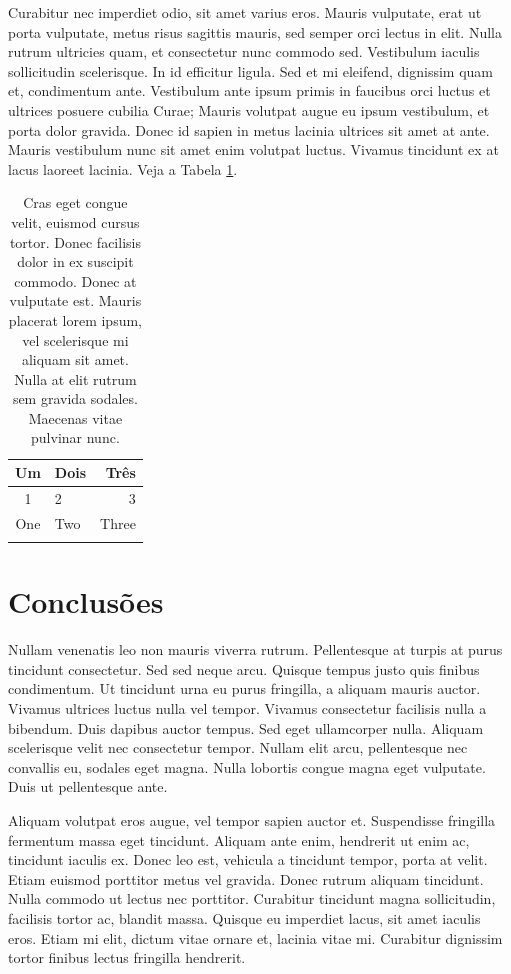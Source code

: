 \begin{btUnit}
Curabitur nec imperdiet odio, sit amet varius eros. Mauris vulputate,
erat ut porta vulputate, metus risus sagittis mauris, sed semper orci
lectus in elit. Nulla rutrum ultricies quam, et consectetur nunc
commodo sed. Vestibulum iaculis sollicitudin scelerisque. In id
efficitur ligula. Sed et mi eleifend, dignissim quam et, condimentum
ante. Vestibulum ante ipsum primis in faucibus orci luctus et ultrices
posuere cubilia Curae; Mauris volutpat augue eu ipsum vestibulum, et
porta dolor gravida. Donec id sapien in metus lacinia ultrices sit
amet at ante. Mauris vestibulum nunc sit amet enim volutpat luctus.
Vivamus tincidunt ex at lacus laoreet lacinia. Veja a Tabela
\ref{Tab:result2}.

\begin{table}
\centering
\caption{Cras eget congue velit, euismod cursus tortor. Donec
  facilisis dolor in ex suscipit commodo. Donec at vulputate est.
  Mauris placerat lorem ipsum, vel scelerisque mi aliquam sit amet.
  Nulla at elit rutrum sem gravida sodales. Maecenas vitae pulvinar
  nunc.}
\begin{tabular}{clr}
\hline
Um & Dois & Três\\
\hline
1 & 2 & 3 \\
One & Two & Three\\
\hline
\label{Tab:result2}
\end{tabular}
\end{table}

\section{Conclusões}

Nullam venenatis leo non mauris viverra rutrum. Pellentesque at turpis
at purus tincidunt consectetur. Sed sed neque arcu. Quisque tempus
justo quis finibus condimentum. Ut tincidunt urna eu purus fringilla,
a aliquam mauris auctor. Vivamus ultrices luctus nulla vel tempor.
Vivamus consectetur facilisis nulla a bibendum. Duis dapibus auctor
tempus. Sed eget ullamcorper nulla. Aliquam scelerisque velit nec
consectetur tempor. Nullam elit arcu, pellentesque nec convallis eu,
sodales eget magna. Nulla lobortis congue magna eget vulputate. Duis
ut pellentesque ante.

Aliquam volutpat eros augue, vel tempor sapien auctor et. Suspendisse
fringilla fermentum massa eget tincidunt. Aliquam ante enim, hendrerit
ut enim ac, tincidunt iaculis ex. Donec leo est, vehicula a tincidunt
tempor, porta at velit. Etiam euismod porttitor metus vel gravida.
Donec rutrum aliquam tincidunt. Nulla commodo ut lectus nec porttitor.
Curabitur tincidunt magna sollicitudin, facilisis tortor ac, blandit
massa. Quisque eu imperdiet lacus, sit amet iaculis eros. Etiam mi
elit, dictum vitae ornare et, lacinia vitae mi. Curabitur dignissim
tortor finibus lectus fringilla hendrerit.


\end{btUnit}
